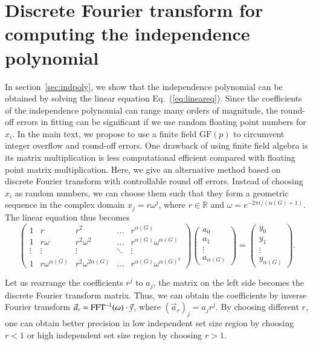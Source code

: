 \documentclass[onefignum, onetabnum]{siamart190516}
\newcommand{\<}{\langle}
\renewcommand{\>}{\rangle}
\newcommand{\Eq}[1]{Eq.~(\ref{#1})}
\begin{document}
\section{Discrete Fourier transform for computing the independence polynomial}\label{app:fft}

In section~\ref{sec:indpoly}, we show that the independence polynomial can be obtained by solving the linear equation \Eq{eq:lineareq}.
Since the coefficients of the independence polynomial can range many orders of magnitude, the round-off errors in fitting can be significant if we use random floating point numbers for $x_{i}$.
In the main text, we propose to use a finite field $\text{GF}(p)$ to circumvent integer overflow and round-off errors.
One drawback of using finite field algebra is its matrix multiplication is less computational efficient compared with floating point matrix multiplication.
Here, we give an alternative method based on discrete Fourier transform with controllable round off errors.
Instead of choosing $x_{i}$ as random numbers, we can choose them such that they form a geometric sequence in the complex domain $x_j = r\omega^j$, where $r \in \mathbb{R}$ and $\omega = e^{-2\pi i/( \alpha(G)+1)}$. The linear equation thus becomes
\begin{equation}
\left(\begin{matrix}
1 & r & r^2 & \ldots & r^{\alpha(G)} \\
1 & r\omega & r^2\omega^2 & \ldots & r^{\alpha(G)} \omega^{\alpha(G)} \\
\vdots & \vdots & \vdots &\ddots & \vdots \\
1 & r\omega^{\alpha(G)} & r^2\omega^{2{\alpha(G)}} & \ldots & r^{\alpha(G)}\omega^{{\alpha(G)}^2}
\end{matrix}\right)
\left(\begin{matrix}
a_0 \\ a_1 \\ \vdots \\ a_{\alpha(G)}
\end{matrix}\right)
= \left(\begin{matrix}
y_0 \\ y_1 \\ \vdots \\ y_{\alpha(G)}
\end{matrix}\right).
\end{equation}

Let us rearrange the coefficients $r^j$ to $a_j$, the matrix on the left side becomes the discrete Fourier transform matrix. Thus, we can obtain the coefficients by inverse Fourier transform $\vec a_r = {\rm FFT^{-1}}(\omega) \cdot \vec y$, where $(\vec a_r)_j = a_j r ^j$.
By choosing different $r$, one can obtain better precision in low independent set size region by choosing $r<1$ or high independent set size region by choosing $r>1$.
\end{document}
